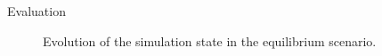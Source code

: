 \begin{frame}[c]{Evaluation}{}
{\begin{figure}[htpb]
\begin{subfigure}[c]{.3\textwidth}
		\end{subfigure}%
		\hfill\begin{subfigure}[c]{.08\textwidth}
			\fastcolorbar
		\end{subfigure}
		\vspace{-0.3cm}
		\caption{Evolution of the simulation state in the equilibrium scenario.}
		\label{fig:evolution_equil}
	\end{figure}
}
\end{frame}
